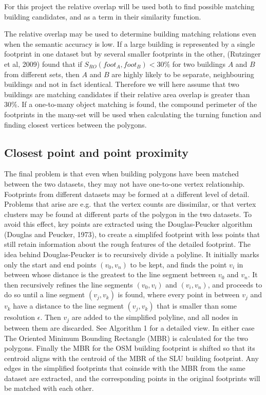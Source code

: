 \documentclass[a4paper]{article}
\begin{document}
For this project the relative overlap will be used both to find possible matching building candidates, and as a term in their similarity function.

The relative overlap may be used to determine building matching relations even when the semantic accuracy is low. If a large building is represented by a single footprint in one dataset but by several smaller footprints in the other, (Rutzinger et al, 2009) found that if $S_{RO}(foot_{A}, foot_{B}) < 30\%$ for two buildings $A$ and $B$ from different sets, then $A$ and $B$ are highly likely to be separate, neighbouring buildings and not in fact identical. Therefore we will here assume that two buildings are matching candidates if their relative area overlap is greater than 30\%. If a one-to-many object matching is found, the compound perimeter of the footprints in the many-set will be used when calculating the turning function and finding closest vertices between the polygons.

\subsection{Closest point and point proximity}

The final problem is that even when building polygons have been matched between the two datasets, they may not have one-to-one vertex relationship. Footprints from different datasets may be formed at a different level of detail. Problems that arise are e.g. that the vertex counts are dissimilar, or that vertex clusters may be found at different parts of the polygon in the two datasets. To avoid this effect, key points are extracted using the Douglas-Peucker algorithm (Douglas and Peucker, 1973), to create a simplifed footprint with less points that still retain information about the rough features of the detailed footprint. The idea behind Douglas-Peucker is to recursively divide a polyline. It initially marks only the start and end points $(v_0, v_n)$ to be kept, and finds the point $v_i$ in between whose distance is the greatest to the line segment between $v_0$ and $v_n$. It then recursively refines the line segments $(v_0, v_i)$ and $(v_i, v_n)$, and proceeds to do so until a line segment $(v_j, v_k)$ is found, where every point in between $v_j$ and $v_k$ have a distance to the line segment $(v_j, v_k)$ that is smaller than some resolution $\epsilon$. Then $v_j$ are added to the simplified polyline, and all nodes in between them are discarded. See Algorithm 1 for a detailed view. In either case The Oriented Minimum Bounding Rectangle (MBR) is calculated for the two polygons. Finally the MBR for the OSM building footprint is shifted so that its centroid aligns with the centroid of the MBR of the SLU building footprint. Any edges in the simplified footprints that coinside with the MBR from the same dataset are extracted, and the corresponding points in the original footprints will be matched with each other.
\end{document}
